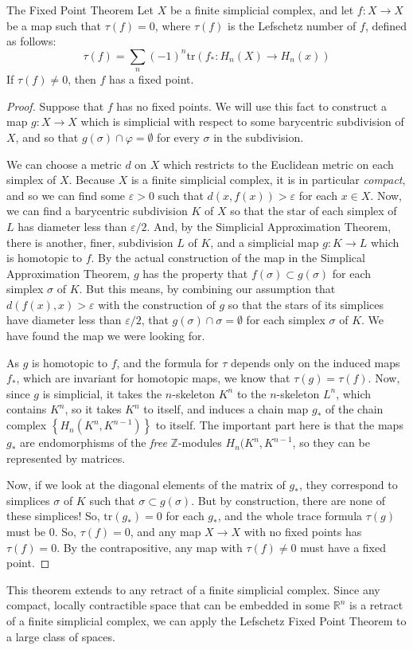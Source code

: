 \documentclass[12pt]{article}
\newcommand{\Z}{\mathbb{Z}}
\newcommand{\R}{\mathbb{R}}
\theoremstyle{definition}
\begin{document}
\begin{section}{The Fixed Point Theorem}
	Let $X$ be a finite simplicial complex, and let $f: X \to X$ be a map such that $\tau(f) = 0$, where $\tau(f)$ is the Lefschetz number of $f$, defined as follows:
	\[\tau(f) = \sum_{n} (-1)^{n} \text{tr}(f_*: H_n(X) \to H_n(x))\]
	If $\tau(f) \neq 0$, then $f$ has a fixed point.
	\begin{proof}
		Suppose that $f$ has no fixed points. We will use this fact to construct a map $g: X \to X$ which is simplicial with respect to some barycentric subdivision of $X$, and so that $g(\sigma) \cap \varphi = \emptyset$ for every $\sigma$ in the subdivision.
		\par We can choose a metric $d$ on $X$ which restricts to the Euclidean metric on each simplex of $X$. Because $X$ is a finite simplicial complex, it is in particular \textit{compact}, and so we can find some $\varepsilon > 0$ such that $d(x,f(x)) > \varepsilon$ for each $x \in X$. Now, we can find a barycentric subdivision $K$ of $X$ so that the star of each simplex of $L$ has diameter less than $\varepsilon/2$. And, by the Simplicial Approximation Theorem, there is another, finer, subdivision $L$ of $K$, and a simplicial map $g: K \to L$ which is homotopic to $f$. By the actual construction of the map in the Simplical Approximation Theorem, $g$ has the property that $f(\sigma) \subset g(\sigma)$ for each simplex $\sigma$ of $K$. But this means, by combining our assumption that $d(f(x), x) > \varepsilon$ with the construction of $g$ so that the stars of its simplices have diameter less than $\varepsilon/2$, that $g(\sigma) \cap \sigma = \emptyset$ for each simplex $\sigma$ of $K$. We have found the map we were looking for.
		\par As $g$ is homotopic to $f$, and the formula for $\tau$ depends only on the induced maps $f_*$, which are invariant for homotopic maps, we know that $\tau(g) = \tau(f)$. Now, since $g$ is simplicial, it takes the $n$-skeleton $K^n$ to the $n$-skeleton $L^n$, which contains $K^n$, so it takes $K^n$ to itself, and induces a chain map $g_*$ of the chain complex $\left\{ H_n(K^n, K^{n-1}) \right\}$ to itself. The important part here is that the maps $g_*$ are endomorphisms of the \textit{free} $\Z$-modules $H_n(K^n, K^{n-1}$, so they can be represented by matrices.
			\par Now, if we look at the diagonal elements of the matrix of $g_*$, they correspond to simplices $\sigma$ of $K$ such that $\sigma \subset g(\sigma)$. But by construction, there are none of these simplices! So, $\text{tr}(g_*) = 0$ for each $g_*$, and the whole trace formula $\tau(g)$ must be $0$. So, $\tau(f) = 0$, and any map $X \to X$ with no fixed points has $\tau(f) = 0$. By the contrapositive, any map with $\tau(f) \neq 0$ must have a fixed point.
	\end{proof}
	This theorem extends to any retract of a finite simplicial complex. Since any compact, locally contractible space that can be embedded in some $\R^n$ is a retract of a finite simplicial complex, we can apply the Lefschetz Fixed Point Theorem to a large class of spaces.
\end{section}
\end{document}
